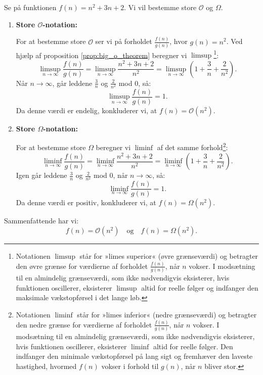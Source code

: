 \begin{example}
    Se på funktionen \( f(n) = n^2 + 3n + 2 \). Vi vil bestemme store $\mathcal{O}$ og $\Omega$.

    \begin{enumerate}
        \item \textbf{Store $\mathcal{O}$-notation:}
        
        For at bestemme store $\mathcal{O}$ ser vi på forholdet \( \frac{f(n)}{g(n)} \), hvor \( g(n) = n^2 \). Ved hjælp af proposition \ref{prop:big_o_theorem} beregner vi \(\limsup\)\footnote{Notationen \(\limsup\) står for »limes superior« (øvre grænseværdi) og betragter den øvre grænse for værdierne af forholdet $\frac{f(n)}{g(n)}$, når $n$ vokser. I modsætning til en almindelig grænseværdi, som ikke nødvendigvis eksisterer, hvis funktionen oscillerer, eksisterer \(\limsup\) altid for reelle følger og indfanger den maksimale vækstopførsel i det lange løb.}:
        \[
        \limsup_{n \to \infty} \frac{f(n)}{g(n)} = \limsup_{n \to \infty} \frac{n^2 + 3n + 2}{n^2} = \limsup_{n \to \infty} \left( 1 + \frac{3}{n} + \frac{2}{n^2} \right).
        \]
        Når \( n \to \infty \), går leddene \( \frac{3}{n} \) og \( \frac{2}{n^2} \) mod \( 0 \), så:
        \[
        \limsup_{n \to \infty} \frac{f(n)}{g(n)} = 1.
        \]
        Da denne værdi er endelig, konkluderer vi, at \( f(n) = \mathcal{O}(n^2) \).

        \item \textbf{Store $\Omega$-notation:}
        
        For at bestemme store $\Omega$ beregner vi \(\liminf\) af det samme forhold\footnote{Notationen \(\liminf\) står for »limes inferior« (nedre grænseværdi) og betragter den nedre grænse for værdierne af forholdet $\frac{f(n)}{g(n)}$, når $n$ vokser. I modsætning til en almindelig grænseværdi, som ikke nødvendigvis eksisterer, hvis funktionen oscillerer, eksisterer \(\liminf\) altid for reelle følger. Den indfanger den minimale vækstopførsel på lang sigt og fremhæver den laveste hastighed, hvormed $f(n)$ vokser i forhold til $g(n)$, når $n$ bliver stor.}:
        \[
        \liminf_{n \to \infty} \frac{f(n)}{g(n)} = \liminf_{n \to \infty} \frac{n^2 + 3n + 2}{n^2} = \liminf_{n \to \infty} \left( 1 + \frac{3}{n} + \frac{2}{n^2} \right).
        \]
        Igen går leddene \( \frac{3}{n} \) og \( \frac{2}{n^2} \) mod \( 0 \), når \( n \to \infty \), så:
        \[
        \liminf_{n \to \infty} \frac{f(n)}{g(n)} = 1.
        \]
        Da denne værdi er positiv, konkluderer vi, at \( f(n) = \Omega(n^2) \).
    \end{enumerate}

    Sammenfattende har vi:
    \[
    f(n) = \mathcal{O}(n^2) \quad \text{og} \quad f(n) = \Omega(n^2).
    \]
\end{example}

